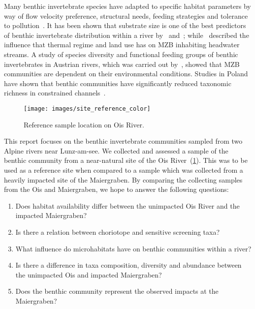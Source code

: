 Many benthic invertebrate species have adapted to specific habitat parameters by way of flow velocity preference, structural needs, feeding strategies and tolerance to pollution~. It has been shown that substrate size is one of the best predictors of benthic invertebrate distribution within a river by~\textcite{Jowett2003} and~\textcite{Schroder2013}; while~\textcite{Dohet2015} described the influence that thermal regime and land use has on MZB inhabiting headwater streams. A study of species diversity and functional feeding groups of benthic invertebrates in Austrian rivers, which was carried out by~, showed that MZB communities are dependent on their environmental conditions. Studies in Poland have shown that benthic communities have significantly reduced taxonomic richness in constrained channels~.

\begin{figure}[!htb]                                                       %
  \center
  \texttt{[image: images/site\_reference\_color]}                 %
  \caption{Reference sample location on Ois River.}                            %
  \label{fig:site_reference}                                                        %
\end{figure}


This report focuses on the benthic invertebrate communities sampled from two Alpine rivers near Lunz-am-see. We collected and assessed a sample of the benthic community from a near-natural site of the Ois River~(\cref{fig:site_reference}). This was to be used as a reference site when compared to a sample which was collected from a heavily impacted site of the Maiergraben. By comparing the collecting samples from the Ois and Maiergraben, we hope to answer the following questions:

\singlespacing                                              %
\begin{enumerate}
  \item Does habitat availability differ between the unimpacted Ois River and the impacted Maiergraben?
  \item Is there a relation between choriotope and sensitive screening taxa?
  \item What influence do microhabitats have on benthic communities within a river?
  \item Is there a difference in taxa composition, diversity and abundance between the unimpacted Ois and impacted Maiergraben?
  \item Does the benthic community represent the observed impacts at the Maiergraben?
\end{enumerate}
\onehalfspacing                                             %


